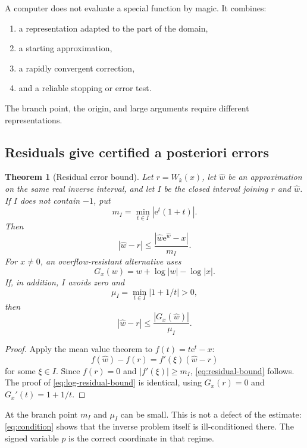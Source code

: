 \documentclass[11pt]{article}
\newtheorem{theorem}{Theorem}[section]
\theoremstyle{remark}
\newcommand{\ee}{\mathrm e}
\newcommand{\abs}[1]{\left|#1\right|}
\begin{document}
A computer does not evaluate a special function by magic.  It combines:
\begin{enumerate}
\item a representation adapted to the part of the domain,
\item a starting approximation,
\item a rapidly convergent correction,
\item and a reliable stopping or error test.
\end{enumerate}
The branch point, the origin, and large arguments require different
representations.

\subsection{Residuals give certified a posteriori errors}

\begin{theorem}[Residual error bound]\label{thm:residual}
Let \(r=W_k(x)\), let \(\widehat w\) be an approximation on the same real
inverse interval, and let \(I\) be the closed interval joining \(r\) and
\(\widehat w\).  If \(I\) does not contain \(-1\), put
\[
       m_I=\min_{t\in I}\abs{\ee^t(1+t)}.
\]
Then
\begin{equation}\label{eq:residual-bound}
 \abs{\widehat w-r}
 \leq
 \frac{\abs{\widehat w\ee^{\widehat w}-x}}{m_I}.
\end{equation}
For \(x\neq0\), an overflow-resistant alternative uses
\[
       G_x(w)=w+\log\abs w-\log\abs x.
\]
If, in addition, \(I\) avoids zero and
\[
       \mu_I=\min_{t\in I}\abs{1+1/t}>0,
\]
then
\begin{equation}\label{eq:log-residual-bound}
       \abs{\widehat w-r}
       \leq\frac{\abs{G_x(\widehat w)}}{\mu_I}.
\end{equation}
\end{theorem}

\begin{proof}
Apply the mean value theorem to
\(f(t)=t\ee^t-x\):
\[
 f(\widehat w)-f(r)
 =f'(\xi)(\widehat w-r)
\]
for some \(\xi\in I\).  Since \(f(r)=0\) and
\(\abs{f'(\xi)}\geq m_I\), \eqref{eq:residual-bound} follows.
The proof of \eqref{eq:log-residual-bound} is identical, using
\(G_x(r)=0\) and \(G_x'(t)=1+1/t\).
\end{proof}

At the branch point \(m_I\) and \(\mu_I\) can be small.  This is not a
defect of the estimate: \cref{eq:condition} shows that the inverse problem
itself is ill-conditioned there.  The signed variable \(p\) is the correct
coordinate in that regime.
\end{document}
